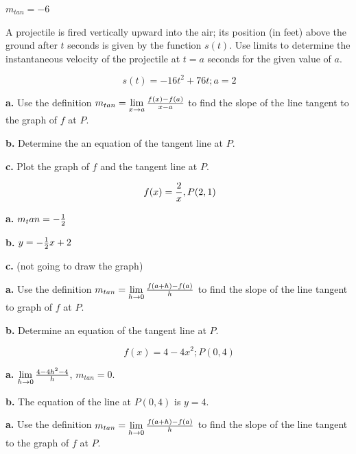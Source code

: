 $m_{tan} = -6$

\bigskip

A projectile is fired vertically upward into the air; its
position (in feet) above the ground after $t$ seconds is
given by the function $s(t)$. Use limits to determine the
instantaneous velocity of the projectile at $t = a$ seconds
for the given value of $a$.

$$\
s(t) = -16t^2 + 76t; a = 2
$$

\par {\bf a.} Use the definition $m_{tan} = \lim\limits_{x \to a} {f(x) - f(a) \over x - a}$
to find the slope of the line tangent to the graph of $f$
at $P$.

\par {\bf b.} Determine the an equation of the tangent line at $P$.

\par {\bf c.} Plot the graph of $f$ and the tangent line at $P$.

$$\
f(x) = {2 \over x}, P(2, 1)
$$


\par {\bf a.} $m_tan = -{1 \over 2}$

\par {\bf b.} $y = -{1 \over 2}x + 2$

\par {\bf c.} (not going to draw the graph)

\bigskip

\par {\bf a.} Use the definition $m_{tan} =
\lim\limits_{h \to 0}{f(a + h) - f(a) \over h}$ to find
the slope of the line tangent to graph of $f$ at $P$.

\par {\bf b.} Determine an equation of the tangent line at $P$.

$$\
f(x) = 4 - 4x^2; P(0, 4)
$$

\par {\bf a.} $\lim\limits_{h \to 0}{4 - 4h^2 - 4 \over h}$,
$m_{tan} = 0$.

\par {\bf b.} The equation of the line at $P(0, 4)$ is $y = 4$.

\bigskip

\par {\bf a.} Use the definition
$m_{tan} = \lim\limits_{h \to 0}{f(a + h) - f(a) \over h}$
to find the slope of the line tangent to the graph of $f$ at $P$.

